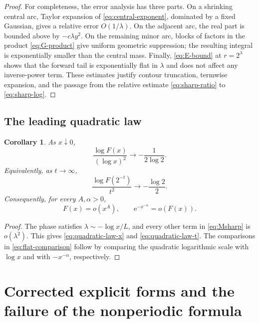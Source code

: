 \documentclass[11pt]{article}
\numberwithin{equation}{section}
\newtheorem{corollary}[theorem]{Corollary}
\theoremstyle{definition}
\theoremstyle{remark}
\newcommand{\e}{\mathrm{e}}
\begin{document}
\begin{proof}
For completeness, the error analysis has three parts.  On a shrinking central
arc, Taylor expansion of \eqref{eq:central-exponent}, dominated by a fixed
Gaussian, gives a relative error $O(1/\lambda)$.  On the adjacent arc, the
real part is bounded above by $-c\lambda y^2$.  On the remaining minor arc,
blocks of factors in the product \eqref{eq:G-product} give uniform geometric
suppression; the resulting integral is exponentially smaller than the
central mass.  Finally, \eqref{eq:E-bound} at $r=2^\lambda$ shows that the
forward tail is exponentially flat in $\lambda$ and does not affect any
inverse-power term.  These estimates justify contour truncation, termwise
expansion, and the passage from the relative estimate
\eqref{eq:sharp-ratio} to \eqref{eq:sharp-log}.
\end{proof}

\subsection{The leading quadratic law}

\begin{corollary}\label{cor:quadratic-law}
As $x\downarrow0$,
\begin{equation}\label{eq:quadratic-law-x}
 \frac{\log F(x)}{(\log x)^2}\longrightarrow-\frac1{2\log2}.
\end{equation}
Equivalently, as $t\to\infty$,
\begin{equation}\label{eq:quadratic-law-t}
 \frac{\log F(2^{-t})}{t^2}\longrightarrow-\frac{\log2}{2}.
\end{equation}
Consequently, for every $A,\alpha>0$,
\begin{equation}\label{eq:flat-comparison}
 F(x)=o(x^A),
 \qquad
 \e^{-x^{-\alpha}}=o(F(x)).
\end{equation}
\end{corollary}

\begin{proof}
The phase satisfies $\lambda\sim-\log x/L$, and every other term in
\eqref{eq:Msharp} is $o(\lambda^2)$.  This gives
\eqref{eq:quadratic-law-x} and \eqref{eq:quadratic-law-t}.  The comparisons in
\eqref{eq:flat-comparison} follow by comparing the quadratic logarithmic
scale with $\log x$ and with $-x^{-\alpha}$, respectively.
\end{proof}

\section{Corrected explicit forms and the failure of the nonperiodic formula}
\label{sec:corrected-explicit}
\end{document}
